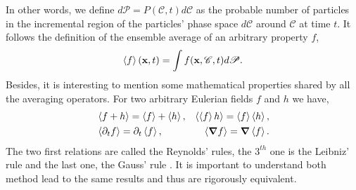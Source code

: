 In other words, we define $d\mathscr{P} = P(\mathscr{C},t)d\mathscr{C}$ as the probable number of particles in the incremental region of the particles' phase space $d\mathscr{C}$ around $\mathscr{C}$ at time $t$. 
It follows the definition of the ensemble average of an arbitrary property $f$,
\begin{equation}
    \left<f\right>(\textbf{x},t)
    =\int f(\textbf{x},\mathscr{C},t) d\mathscr{P}. 
    \label{eq:ensemble_avg}
\end{equation}  
Besides, it is interesting to mention some mathematical properties shared by all the averaging operators. 
For two arbitrary Eulerian fields $f$ and $h$ we have,
\begin{align}
    &\left<f+h\right> = \left<f\right>+\left<h\right>, 
    &\left<\left<f\right>h\right> = \left<f\right>\left<h\right>, \nonumber \\
    &\left<\partial_t f\right> 
    = \partial_t\left<f\right>, 
    &\left<\bm{\nabla} f\right>
    = \bm{\nabla} \left<f\right>. 
    \label{eq:avg_properties}
\end{align}
The two first relations are called the Reynolds' rules, the $3^{th}$ one is the Leibniz' 
rule and the last one, the Gauss' rule \citep{drew1983mathematical}.
It is important to understand both method lead to the same results and thus are rigorously equivalent. 

